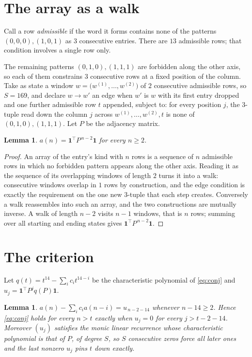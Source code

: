 \documentclass[11pt,a4paper]{article}
\theoremstyle{plain}
\newtheorem{lemma}[theorem]{Lemma}
\theoremstyle{definition}
\begin{document}
\section{The array as a walk}

Call a row \emph{admissible} if the word it forms contains none of the patterns
$(0,0,0), (1,0,1)$ as $3$ consecutive entries. There are $13$ admissible rows; that condition
involves a single row only.

The remaining patterns $(0,1,0), (1,1,1)$ are forbidden along the other axis, so each of them
constrains $3$ consecutive rows at a fixed position of the column. Take as state a
window $w=\bigl(w^{(1)},\dots,w^{(2)}\bigr)$ of $2$ consecutive admissible
rows, so $S=169$, and declare $w\to w'$ an edge when $w'$ is $w$ with its first entry
dropped and one further admissible row $t$ appended, subject to: for every position
$j$, the $3$-tuple read down the column $j$ across $w^{(1)},\dots,w^{(2)},t$
is none of $(0,1,0), (1,1,1)$. Let $P$ be the adjacency matrix.

\begin{lemma}\label{lem:walk}
$a(n)=\mathbf{1}^{\!\top}P^{\,n-2}\mathbf{1}$ for every $n\ge2$.
\end{lemma}

\begin{proof}
An array of the entry's kind with $n$ rows is a sequence of $n$ admissible rows in
which no forbidden pattern appears along the other axis. Reading it as the sequence of its
overlapping windows of length $2$ turns it into a walk: consecutive windows overlap in
$1$ rows by construction, and the edge condition is exactly the requirement on the one
new $3$-tuple that each step creates. Conversely a walk reassembles into such an array,
and the two constructions are mutually inverse. A walk of length $n-2$ visits $n-1$
windows, that is $n$ rows; summing over all starting and ending states gives
$\mathbf{1}^{\!\top}P^{\,n-2}\mathbf{1}$.
\end{proof}

\section{The criterion}

Let $q(t)=t^{14}-\sum_i c_i t^{14-i}$ be the characteristic polynomial of
\eqref{eq:conj} and $u_j=\mathbf{1}^{\!\top}P^{j}q(P)\mathbf{1}$.

\begin{lemma}\label{lem:crit}
$a(n)-\sum_i c_i a(n-i)=u_{\,n-2-14}$ whenever $n-14\ge2$. Hence
\eqref{eq:conj} holds for every $n>t$ exactly when $u_j=0$ for every
$j>t-2-14$. Moreover $(u_j)$ satisfies the monic linear recurrence whose
characteristic polynomial is that of $P$, of degree $S$, so $S$ consecutive zeros force all
later ones and the last nonzero $u_j$ pins $t$ down exactly.
\end{lemma}
\end{document}
